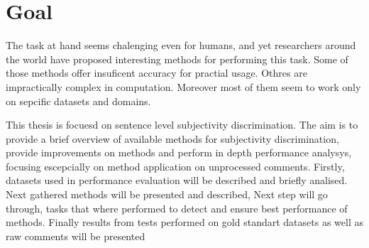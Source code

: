\section{ Goal }


The task at hand seems chalenging even for humans, and yet researchers around the world have proposed interesting methods
for performing this task. Some of those methods offer insuficent accuracy for practial usage. Othres are impractically complex
in computation. Moreover most of them seem to work only on sepcific datasets and domains. 

This thesis is focuesd on sentence level subjectivity discrimination. The aim is to provide a brief overview of available methods
for subjectivity discrimination, provide improvements on  methods and perform in depth performance analysys, focusing escepcially on method application on unprocessed comments. 
Firstly, datasets used in performance evaluation will be described and briefly analised. Next gathered methods will be presented and described, 
Next step will go through, tasks that where performed to detect and ensure best performance of methods. Finally results from tests performed on gold 
standart datasets as well as raw comments will be presented